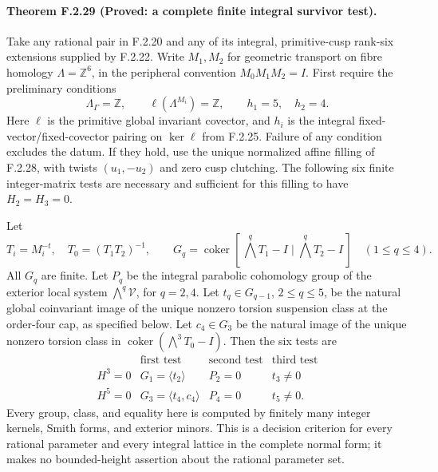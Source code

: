 \paragraph{Theorem F.2.29 (Proved: a complete finite integral survivor test).}
Take any rational pair in F.2.20 and any of its integral,
primitive-cusp rank-six extensions supplied by F.2.22.
Write $M_1,M_2$ for geometric transport on fibre homology
$\Lambda=\mathbb Z^6$, in the peripheral convention
$M_0M_1M_2=I$.
First require the preliminary conditions
\[
 \Lambda_\Gamma=\mathbb Z,\qquad
 \ell(\Lambda^{M_i})=\mathbb Z,\qquad h_1=5,\quad h_2=4 .
 \tag{F.HC1}
\]
Here $\ell$ is the primitive global invariant covector, and
$h_i$ is the integral fixed-vector/fixed-covector pairing
on $\ker\ell$ from F.2.25.
Failure of any condition excludes the datum.
If they hold, use the unique normalized affine filling of
F.2.28, with twists $(u_1,-u_2)$ and zero cusp clutching.
The following six finite integer-matrix tests are necessary
and sufficient for this filling to have $H_2=H_3=0$.

Let
\[
 T_i=M_i^{-t},\quad T_0=(T_1T_2)^{-1},\qquad
 G_q=\operatorname{coker}
 [\,\bigwedge^qT_1-I\mid\bigwedge^qT_2-I\,]
 \quad(1\le q\le4).
 \tag{F.HC2}
\]
All $G_q$ are finite.  Let $P_q$ be the integral parabolic
cohomology group of the exterior local system
$\bigwedge^q\mathcal V$, for $q=2,4$.
Let $t_q\in G_{q-1}$, $2\le q\le5$, be the natural global
coinvariant image of the unique nonzero torsion suspension
class at the order-four cap, as specified below.
Let $c_4\in G_3$ be the natural image of the unique nonzero
torsion class in
$\operatorname{coker}(\bigwedge^3T_0-I)$.
Then the six tests are
\[
\begin{array}{c|ccc}
 &\text{first test}&\text{second test}&\text{third test}\\ \hline
 H^3=0&G_1=\langle t_2\rangle&P_2=0&t_3\ne0\\
 H^5=0&G_3=\langle t_4,c_4\rangle&P_4=0&t_5\ne0 .
\end{array}
\tag{F.HC3}
\]
Every group, class, and equality here is computed by
finitely many integer kernels, Smith forms, and exterior
minors.  This is a decision criterion for every rational
parameter and every integral lattice in the complete
normal form; it makes no bounded-height assertion about
the rational parameter set.

